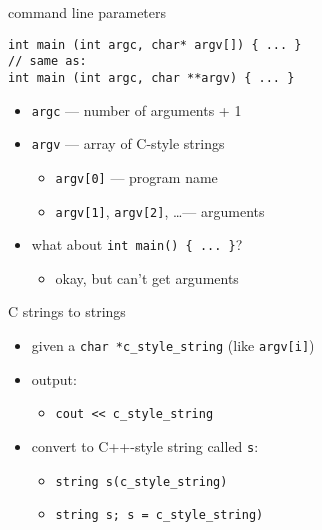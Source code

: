 \begin{frame}[fragile,label=cmdLineP]{command line parameters }
\lstset{
    language=C++,
    style=small
}
\begin{lstlisting}
int main (int argc, char* argv[]) { ... }
// same as:
int main (int argc, char **argv) { ... }
\end{lstlisting}
\begin{itemize}
\item \texttt{argc} --- number of arguments + 1
\item \texttt{argv} --- array of C-style strings
    \begin{itemize}
    \item \texttt{argv[0]} --- program name
    \item \texttt{argv[1]}, \texttt{argv[2]}, \ldots --- arguments
    \end{itemize}
\vspace{.5cm}
\item what about \lstinline|int main() { ... }|?
    \begin{itemize}
    \item okay, but can't get arguments
    \end{itemize}
\end{itemize}
\end{frame}

\begin{frame}[fragile,label=cStringVString]{C strings to strings}
\begin{itemize}
\item given a \lstinline|char *c_style_string| (like \lstinline|argv[i]|)
\vspace{.5cm}
\item output:
    \begin{itemize}
    \item \lstinline|cout << c_style_string|
    \end{itemize}
\item convert to C++-style string called \texttt{s}:
    \begin{itemize}
    \item \lstinline|string s(c_style_string)| 
    \item \lstinline|string s; s = c_style_string)| 
    \end{itemize}
\end{itemize}
\end{frame}


